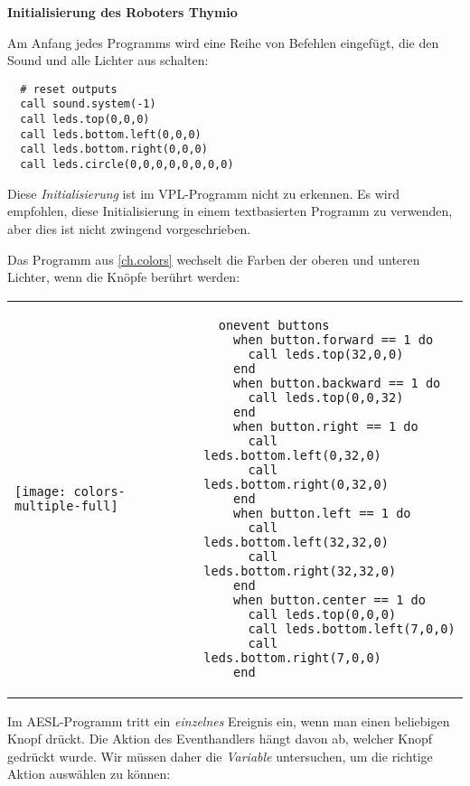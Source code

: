 \textbf{\large Initialisierung des Roboters Thymio}

Am Anfang jedes Programms wird eine Reihe von Befehlen eingefügt, die den Sound und alle Lichter aus schalten:

\begin{footnotesize}
\begin{verbatim}
  # reset outputs
  call sound.system(-1)
  call leds.top(0,0,0)
  call leds.bottom.left(0,0,0)
  call leds.bottom.right(0,0,0)
  call leds.circle(0,0,0,0,0,0,0,0)
\end{verbatim}
\end{footnotesize}

Diese \emph{Initialisierung} ist im VPL-Programm nicht zu erkennen. Es wird empfohlen, diese Initialisierung in einem textbasierten Programm zu verwenden, aber dies ist nicht zwingend vorgeschrieben. 


Das Programm  aus \cref{ch.colors} wechselt die Farben der oberen und unteren Lichter, wenn die Knöpfe berührt werden:

\begin{center}
\begin{tabular}{ll}
\texttt{[image: colors-multiple-full]} &
\begin{minipage}[b]{.5\textwidth}
\begin{footnotesize}
\begin{verbatim}
  onevent buttons
    when button.forward == 1 do
      call leds.top(32,0,0)
    end
    when button.backward == 1 do
      call leds.top(0,0,32)
    end
    when button.right == 1 do
      call leds.bottom.left(0,32,0)
      call leds.bottom.right(0,32,0)
    end
    when button.left == 1 do
      call leds.bottom.left(32,32,0)
      call leds.bottom.right(32,32,0)
    end
    when button.center == 1 do
      call leds.top(0,0,0)
      call leds.bottom.left(7,0,0)
      call leds.bottom.right(7,0,0)
    end
\end{verbatim}
\end{footnotesize}
\vspace*{5ex}
\end{minipage}
\end{tabular}
\end{center}

Im AESL-Programm tritt ein \emph{einzelnes} Ereignis ein, wenn man einen beliebigen Knopf drückt. Die Aktion des Eventhandlers  hängt davon ab, welcher Knopf gedrückt wurde. Wir müssen daher die \emph{Variable}  untersuchen, um die richtige Aktion auswählen zu können:

